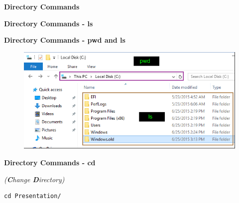 \documentclass[ignorenonframetext,]{beamer}
\begin{document}
\begin{frame}[fragile]{\textbf{Directory Commands}}
\begin{block}{\textbf{Directory Commands - {\textbf{ls}}}}
\end{block}

\begin{block}{\textbf{Directory Commands - pwd and ls}}

\begin{figure}
\centering
\includegraphics{win_folder.png}
\caption{}
\end{figure}

\end{block}

\begin{block}{\textbf{Directory Commands - {\textbf{cd}}}}

\emph{(\textbf{C}hange \textbf{D}irectory)}

\begin{verbatim}
cd Presentation/
\end{verbatim}


\end{block}
\end{frame}
\end{document}
